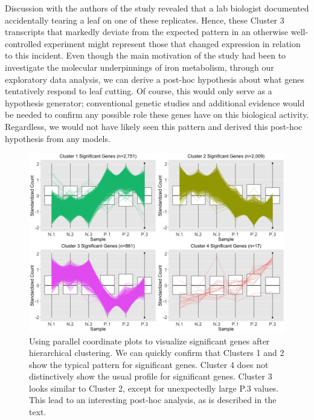 \documentclass{bioinfo}
\begin{document}
Discussion with the authors of the study revealed that a lab biologist documented accidentally tearing a leaf on one of these replicates. Hence, these Cluster 3 transcripts that markedly deviate from the expected pattern in an otherwise well-controlled experiment might represent those that changed expression in relation to this incident. Even though the main motivation of the study had been to investigate the molecular underpinnings of iron metabolism, through our exploratory data analysis, we can derive a post-hoc hypothesis about what genes tentatively respond to leaf cutting. Of course, this would only serve as a hypothesis generator; conventional genetic studies and additional evidence would be needed to confirm any possible role these genes have on this biological activity. Regardless, we would not have likely seen this pattern and derived this post-hoc hypothesis from any models.

\begin{figure}[!tpb]
\centerline{\includegraphics[width=\columnwidth]{../Bioinformatics/Pictures/FilterNotSig/ClusteringdataFDR05/NPSig4.jpg}}
\caption{Using parallel coordinate plots to visualize significant genes after hierarchical clustering. We can quickly confirm that Clusters 1 and 2 show the typical pattern for significant genes. Cluster 4 does not distinctively show the usual profile for significant genes. Cluster 3 looks similar to Cluster 2, except for unexpectedly large P.3 values. This lead to an interesting post-hoc analysis, as is described in the text.
\label{clusterPCP4Sig}}
\end{figure}
\end{document}
